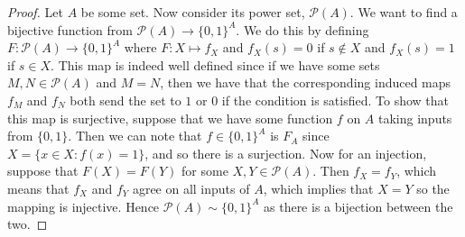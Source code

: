 \documentclass[9pt,reqno]{amsart}
\theoremstyle{definition}
\begin{document}
\begin{proof}
	Let $A$ be some set. Now consider its power set, $\mathcal P(A)$. We want to find a bijective function from $\mathcal P (A) \to \{ 0, 1\}^A$. We do this by defining $F \colon \mathcal P(A) \to \{0, 1 \}^A$ where $F \colon X \mapsto f_X$ and $f_X (s) = 0$ if $s \notin X$ and  $f_X(s) = 1$ if $s \in X$. This map is indeed well defined since if we have some sets $M, N \in \mathcal P(A)$ and $M = N$, then we have that the corresponding induced maps $f_M$ and $f_N$ both send the set to $1$ or $0$ if the condition is satisfied. To show that this map is surjective, suppose that we have some function $f$ on $A$ taking inputs from $\{ 0, 1 \}$. Then we can note that $f \in \{ 0, 1 \}^A$ is $F_A$ since $X = \{ x \in X \colon f (x) = 1 \}$, and so there is a surjection. Now for an injection, suppose that $F(X) = F(Y)$ for some $X, Y \in \mathcal P(A)$. Then $f_X = f_Y$, which means that $f_X$ and $f_Y$ agree on all inputs of $A$, which implies that $X = Y$ so the mapping is injective. Hence $\mathcal P(A) \sim \{0, 1 \}^A$ as there is a bijection between the two. 
	\end{proof}
\end{document}
